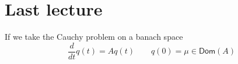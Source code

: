 \section{Last lecture}
If we take the Cauchy problem on a banach space
\begin{equation*}
	\frac{d}{dt}q(t)=A q(t)\qquad q(0)=\mu\in\mathsf{Dom}(A)
\end{equation*}